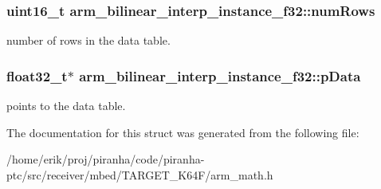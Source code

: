 \subsubsection[{\texorpdfstring{num\+Rows}{numRows}}]{\setlength{\rightskip}{0pt plus 5cm}uint16\+\_\+t arm\+\_\+bilinear\+\_\+interp\+\_\+instance\+\_\+f32\+::num\+Rows}\hypertarget{structarm__bilinear__interp__instance__f32_a34f2b17cc57b95011960df9718af6ed6}{}\label{structarm__bilinear__interp__instance__f32_a34f2b17cc57b95011960df9718af6ed6}
number of rows in the data table. 
\subsubsection[{\texorpdfstring{p\+Data}{pData}}]{\setlength{\rightskip}{0pt plus 5cm}float32\+\_\+t$\ast$ arm\+\_\+bilinear\+\_\+interp\+\_\+instance\+\_\+f32\+::p\+Data}\hypertarget{structarm__bilinear__interp__instance__f32_afd1e764591c991c212d56c893efb5ea4}{}\label{structarm__bilinear__interp__instance__f32_afd1e764591c991c212d56c893efb5ea4}
points to the data table. 

The documentation for this struct was generated from the following file\+:\begin{DoxyCompactItemize}
\item 
/home/erik/proj/piranha/code/piranha-\/ptc/src/receiver/mbed/\+T\+A\+R\+G\+E\+T\+\_\+\+K64\+F/arm\+\_\+math.\+h\end{DoxyCompactItemize}
